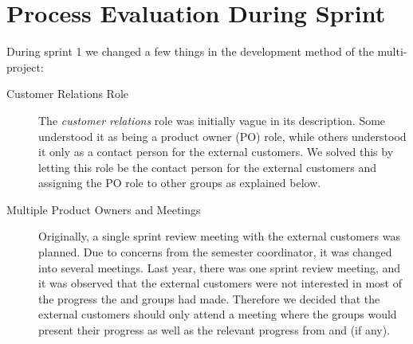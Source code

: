\section{Process Evaluation During Sprint}\label{sec:s1_processeval}
During sprint 1 we changed a few things in the development method of the multi-project:

\begin{description}
  \item[Customer Relations Role] The \emph{customer relations} role was initially vague in its description. Some understood it as being a product owner (PO) role, while others understood it only as a contact person for the external customers. We solved this by letting this role be the contact person for the external customers and assigning the PO role to other groups as explained below.
  \item[Multiple Product Owners and Meetings] Originally, a single sprint review meeting with the external customers was planned. Due to concerns from the semester coordinator, it was changed into several meetings. Last year, there was one sprint review meeting, and it was observed that the external customers were not interested in most of the progress the \db and \bd groups had made. Therefore we decided that the external customers should only attend a meeting where the \gui groups would present their progress as well as the relevant progress from \db and \bd (if any). 
  

\end{description}
